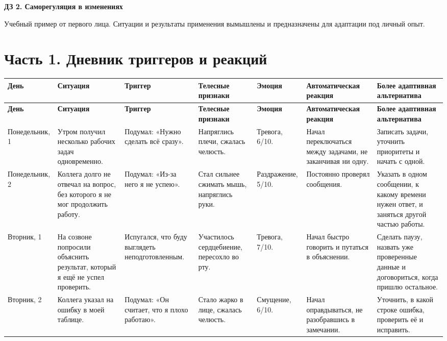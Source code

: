 \documentclass[10pt,a4paper]{article}
\begin{document}
{\LARGE\bfseries ДЗ 2. Саморегуляция в изменениях\par}

Учебный пример от первого лица. Ситуации и результаты применения вымышлены и предназначены для адаптации под личный опыт.

\section*{Часть 1. Дневник триггеров и реакций}

\begingroup\footnotesize\setlength{\tabcolsep}{3pt}
\begin{longtable}{|p{19mm}|p{39mm}|p{37mm}|p{31mm}|p{20mm}|p{35mm}|p{51mm}|}\hline
\rowcolor{accent} \color{white}\bfseries День & \color{white}\bfseries Ситуация & \color{white}\bfseries Триггер & \color{white}\bfseries Телесные признаки & \color{white}\bfseries Эмоция & \color{white}\bfseries Автоматическая реакция & \color{white}\bfseries Более адаптивная альтернатива\\\hline
\endfirsthead
\rowcolor{accent} \color{white}\bfseries День & \color{white}\bfseries Ситуация & \color{white}\bfseries Триггер & \color{white}\bfseries Телесные признаки & \color{white}\bfseries Эмоция & \color{white}\bfseries Автоматическая реакция & \color{white}\bfseries Более адаптивная альтернатива\\\hline
\endhead
Понедельник, 1 & Утром получил несколько рабочих задач одновременно. & Подумал: «Нужно сделать всё сразу». & Напряглись плечи, сжалась челюсть. & Тревога, 6/10. & Начал переключаться между задачами, не заканчивая ни одну. & Записать задачи, уточнить приоритеты и начать с одной.\\\hline
Понедельник, 2 & Коллега долго не отвечал на вопрос, без которого я не мог продолжить работу. & Подумал: «Из-за него я не успею». & Стал сильнее сжимать мышь, напряглись руки. & Раздражение, 5/10. & Постоянно проверял сообщения. & Указать в одном сообщении, к какому времени нужен ответ, и заняться другой частью работы.\\\hline
Вторник, 1 & На созвоне попросили объяснить результат, который я ещё не успел проверить. & Испугался, что буду выглядеть неподготовленным. & Участилось сердцебиение, пересохло во рту. & Тревога, 7/10. & Начал быстро говорить и путаться в объяснении. & Сделать паузу, назвать уже проверенные данные и договориться, когда пришлю остальное.\\\hline
Вторник, 2 & Коллега указал на ошибку в моей таблице. & Подумал: «Он считает, что я плохо работаю». & Стало жарко в лице, сжалась челюсть. & Смущение, 6/10. & Начал оправдываться, не разобравшись в замечании. & Уточнить, в какой строке ошибка, проверить её и исправить.\\\hline

\end{longtable}
\end{document}
